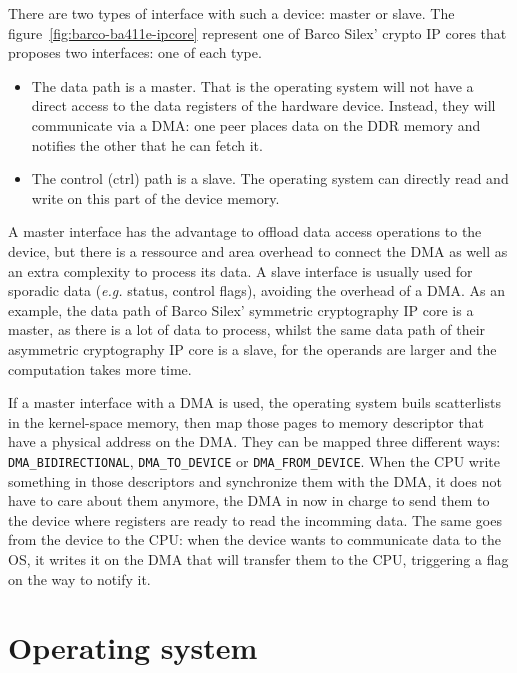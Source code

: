 There are two types of interface with such a device: master or slave.
The figure~\ref{fig:barco-ba411e-ipcore}  represent one of Barco Silex' crypto IP cores that proposes two interfaces: one of each type.
\begin{itemize}
	\item The data path is a master. That is the operating system will not have a direct access to the data registers of the hardware device. Instead, they will communicate via a DMA: one peer places data on the DDR memory and notifies the other that he can fetch it.
	\item The control (ctrl) path is a slave. The operating system can directly read and write on this part of the device memory.
\end{itemize}

A master interface has the advantage to offload data access operations to the device, but there is a ressource and area overhead to connect the DMA as well as an extra complexity to process its data.
A slave interface is usually used for sporadic data (\textit{e.g.} status, control flags), avoiding the overhead of a DMA.
As an example, the data path of Barco Silex' symmetric cryptography IP core is a master, as there is a lot of data to process, whilst the same data path of their asymmetric cryptography IP core is a slave, for the operands are larger and the computation takes more time.\newline{}

If a master interface with a DMA is used, the operating system buils scatterlists in the kernel-space memory, then map those pages to memory descriptor that have a physical address on the DMA.
They can be mapped three different ways: \texttt{DMA\_BIDIRECTIONAL}, \texttt{DMA\_TO\_DEVICE} or \texttt{DMA\_FROM\_DEVICE}.
When the CPU write something in those descriptors and synchronize them with the DMA, it does not have to care about them anymore, the DMA in now in charge to send them to the device where registers are ready to read the incomming data.
The same goes from the device to the CPU: when the device wants to communicate data to the OS, it writes it on the DMA that will transfer them to the CPU, triggering a flag on the way to notify it.



\section{Operating system}

